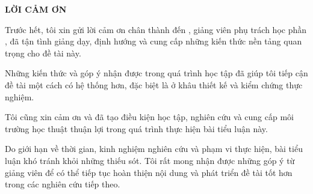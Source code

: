 \newpage
\thispagestyle{plain}

\begin{center}
    {\bfseries\Large LỜI CẢM ƠN}
\end{center}

\vspace{1cm}

Trước hết, tôi xin gửi lời cảm ơn chân thành đến \lecturer, giảng viên phụ trách học phần
\coursename, đã tận tình giảng dạy, định hướng và cung cấp những kiến thức nền tảng quan trọng
cho đề tài này.

Những kiến thức và góp ý nhận được trong quá trình học tập đã giúp tôi tiếp cận đề tài một cách có hệ thống hơn, đặc biệt là ở khâu thiết kế và kiểm chứng thực nghiệm.

Tôi cũng xin cảm ơn \university{} và \faculty{} đã tạo điều kiện học tập, nghiên cứu và cung cấp
môi trường học thuật thuận lợi trong quá trình thực hiện bài tiểu luận này. 

Do giới hạn về thời gian, kinh nghiệm nghiên cứu và phạm vi thực hiện, bài tiểu luận khó tránh
khỏi những thiếu sót. Tôi rất mong nhận được những góp ý từ giảng viên để có thể tiếp tục hoàn
thiện nội dung và phát triển đề tài tốt hơn trong các nghiên cứu tiếp theo.
